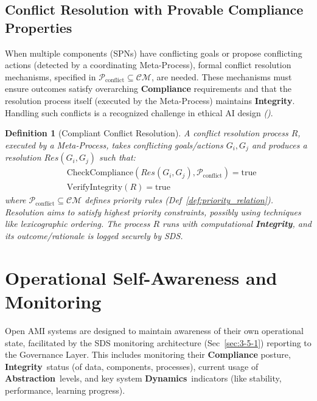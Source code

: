 \documentclass[12pt,a4paper]{report}
\renewcommand{\citep}[1]{\textit{\scriptsize{(\cite{#1})}}}
\newtheorem{definition}{Definition}[section]
\newcommand{\Integrity}{\textbf{Integrity}}
\newcommand{\Abstraction}{\textbf{Abstraction}}
\newcommand{\Dynamics}{\textbf{Dynamics}}
\begin{document}
	\subsection{Conflict Resolution with Provable Compliance Properties}
	\label{sec:2-10-2}
	
	When multiple components (SPNs) have conflicting goals or propose conflicting actions (detected by a coordinating Meta-Process), formal conflict resolution mechanisms, specified in $\mathcal{P}_{\text{conflict}} \subseteq \mathcal{CM}$, are needed. These mechanisms must ensure outcomes satisfy overarching \textbf{Compliance} requirements and that the resolution process itself (executed by the Meta-Process) maintains \Integrity. Handling such conflicts is a recognized challenge in ethical AI design \citep{Sekrst2024Guardrails}.
	
	\begin{definition}[Compliant Conflict Resolution]
		\label{def:compliant_conflict_resolution}
		A conflict resolution process $R$, executed by a Meta-Process, takes conflicting goals/actions $G_i, G_j$ and produces a resolution $Res(G_i, G_j)$ such that:
		\begin{align}
			&\text{CheckCompliance}(Res(G_i, G_j), \mathcal{P}_{\text{conflict}}) = \text{true} \label{eq:conflict-comp} \\
			&\text{VerifyIntegrity}(R) = \text{true} \label{eq:conflict-int}
		\end{align}
		where $\mathcal{P}_{\text{conflict}} \subseteq \mathcal{CM}$ defines priority rules (Def~\ref{def:priority_relation}). Resolution aims to satisfy highest priority constraints, possibly using techniques like lexicographic ordering. The process $R$ runs with computational \Integrity, and its outcome/rationale is logged securely by SDS.
	\end{definition}
	
	\section{Operational Self-Awareness and Monitoring}
	\label{sec:2-11}
	
	Open AMI systems are designed to maintain awareness of their own operational state, facilitated by the SDS monitoring architecture (Sec~\ref{sec:3-5-1}) reporting to the Governance Layer. This includes monitoring their \textbf{Compliance} posture, \Integrity\ status (of data, components, processes), current usage of \Abstraction\ levels, and key system \Dynamics\ indicators (like stability, performance, learning progress).
	
\end{document}
